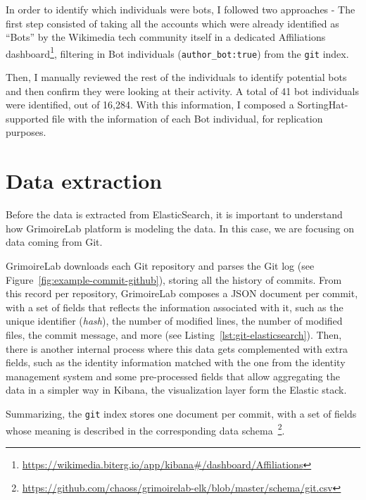 \documentclass[a4paper, 12pt]{book}
\begin{document}
In order to identify which individuals were bots, I followed two approaches - The first step consisted of taking all the accounts which were already identified as ``Bots'' by the Wikimedia tech community itself in a dedicated Affiliations dashboard\footnote{\url{https://wikimedia.biterg.io/app/kibana\#/dashboard/Affiliations}}, filtering in Bot individuals (\texttt{author\_bot:true}) from the \texttt{git} index.

Then, I manually reviewed the rest of the individuals to identify potential bots and then confirm they were looking at their activity. A total of 41 bot individuals were identified, out of 16,284. With this information, I composed a SortingHat-supported file with the information of each Bot individual, for replication purposes.


\section{Data extraction} 
\label{sec:data-extraction}

Before the data is extracted from ElasticSearch, it is important to understand how GrimoireLab platform is modeling the data. In this case, we are focusing on data coming from Git.

GrimoireLab downloads each Git repository and parses the Git log (see Figure~\ref{fig:example-commit-github}), storing all the history of commits. From this record per repository, GrimoireLab composes a JSON document per commit, with a set of fields that reflects the information associated with it, such as the unique identifier (\textit{hash}), the number of modified lines, the number of modified files, the commit message, and more (see Listing~\ref{lst:git-elasticsearch}). Then, there is another internal process where this data gets complemented with extra fields, such as the identity information matched with the one from the identity management system and some pre-processed fields that allow aggregating the data in a simpler way in Kibana, the visualization layer form the Elastic stack.

Summarizing, the \texttt{git} index stores one document per commit, with a set of fields whose meaning is described in the corresponding data schema~\footnote{\url{https://github.com/chaoss/grimoirelab-elk/blob/master/schema/git.csv}}.
\end{document}
